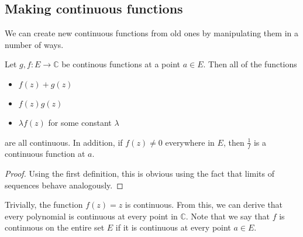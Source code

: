 \subsection{Making continuous functions}
We can create new continuous functions from old ones by manipulating them in a number of ways.
\begin{proposition}
	Let \(g, f \colon E \to \mathbb C\) be continous functions at a point \(a \in E\).
	Then all of the functions
	\begin{itemize}
		\item \(f(z) + g(z)\)
		\item \(f(z)g(z)\)
		\item \(\lambda f(z)\) for some constant \(\lambda\)
	\end{itemize}
	are all continuous.
	In addition, if \(f(z) \neq 0\) everywhere in \(E\), then \(\frac{1}{f}\) is a continuous function at \(a\).
\end{proposition}
\begin{proof}
	Using the first definition, this is obvious using the fact that limits of sequences behave analogously.
\end{proof}
Trivially, the function \(f(z) = z\) is continuous.
From this, we can derive that every polynomial is continuous at every point in \(\mathbb C\).
Note that we say that \(f\) is continuous on the entire set \(E\) if it is continuous at every point \(a \in E\).

